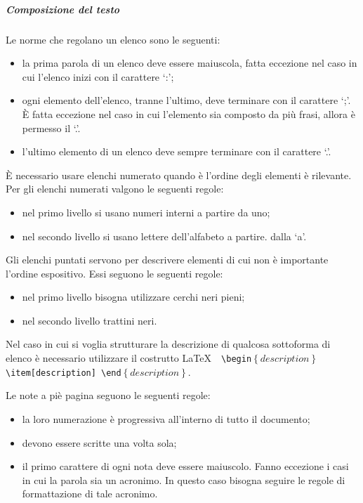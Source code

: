\documentclass[../NormeProgetto.tex]{subfiles}
\begin{document}
		\subparagraph{Composizione del testo}
			Le norme che regolano un elenco sono le seguenti:
			\begin{itemize}
				\item la prima parola di un elenco deve essere maiuscola, fatta eccezione nel caso in cui l'elenco inizi con il carattere `:';
				\item ogni elemento dell'elenco, tranne l'ultimo, deve terminare con il carattere `;'. È fatta eccezione nel caso in cui l'elemento sia composto da più frasi, allora è permesso il `.'.
				\item l'ultimo elemento di un elenco deve sempre terminare con il carattere `.'.
			\end{itemize}
È necessario usare elenchi numerato quando è l'ordine degli elementi è rilevante. Per gli elenchi numerati valgono le seguenti regole:
			\begin{itemize}
				\item nel primo livello si usano numeri interni a partire da uno;
				\item nel secondo livello si usano lettere dell'alfabeto a partire. dalla `a'.
			\end{itemize}
Gli elenchi puntati servono per descrivere elementi di cui non è importante l'ordine espositivo. Essi seguono le seguenti regole:
			\begin{itemize}
				\item nel primo livello bisogna utilizzare cerchi neri pieni;
				\item nel secondo livello trattini neri.
			\end{itemize}
			
			
			Nel caso in cui si voglia strutturare la descrizione di qualcosa sottoforma di elenco è necessario utilizzare il costrutto \LaTeX\ \texttt{ \textbackslash begin$\left\{description\right\}$ \textbackslash item[description] \textbackslash end$\left\{description\right\}$}.			
			
			Le note a piè pagina seguono le seguenti regole:
			\begin{itemize}
				\item la loro numerazione è progressiva all'interno di tutto il documento;
				\item devono essere scritte una volta sola;
				\item il primo carattere di ogni nota deve essere maiuscolo. Fanno eccezione i casi in cui la parola sia un acronimo. In questo caso bisogna seguire le regole di formattazione di tale acronimo.
			\end{itemize}
			
\end{document}
